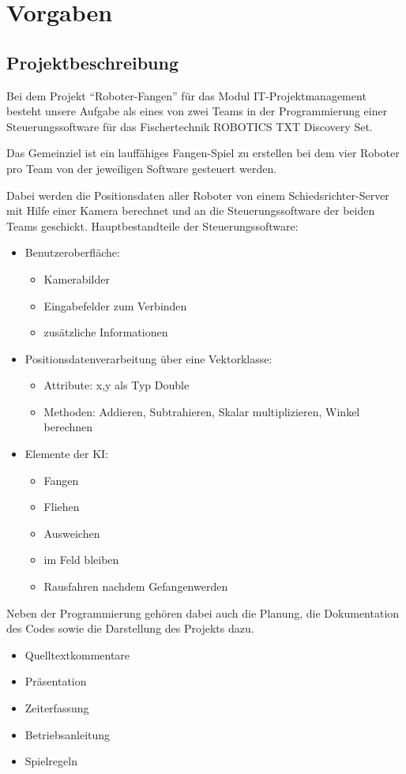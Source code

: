 \section{Vorgaben}
\subsection{Projektbeschreibung}
Bei dem Projekt "`Roboter-Fangen"' für das Modul IT-Projektmanagement besteht unsere Aufgabe als eines von zwei Teams in der Programmierung einer Steuerungssoftware für das Fischertechnik ROBOTICS TXT Discovery Set.

Das Gemeinziel ist ein lauffähiges Fangen-Spiel zu erstellen bei dem vier Roboter pro Team von der jeweiligen Software gesteuert werden.

Dabei werden die Positionsdaten aller Roboter von einem Schiedsrichter-Server mit Hilfe einer Kamera berechnet und an die Steuerungssoftware der beiden Teams geschickt.
Hauptbestandteile der Steuerungssoftware:
\begin{itemize}
	\item Benutzeroberfläche:
	\begin{itemize}
		\item Kamerabilder
		\item Eingabefelder zum Verbinden
		\item zusätzliche Informationen
	\end{itemize}
	\item Positionsdatenverarbeitung über eine Vektorklasse:
	\begin{itemize}
		\item Attribute: x,y als Typ Double
		\item Methoden: Addieren, Subtrahieren, Skalar multiplizieren, Winkel berechnen
	\end{itemize}
	\item Elemente der KI:
	\begin{itemize}
		\item Fangen
		\item Fliehen
		\item Ausweichen
		\item im Feld bleiben
		\item Rausfahren nachdem Gefangenwerden\\
	\end{itemize}
\end{itemize}
Neben der Programmierung gehören dabei auch die Planung, die Dokumentation des Codes sowie die Darstellung des Projekts dazu.
\begin{itemize}
	\item Quelltextkommentare
	\item Präsentation
	\item Zeiterfassung
	\item Betriebsanleitung
	\item Spielregeln
\end{itemize}